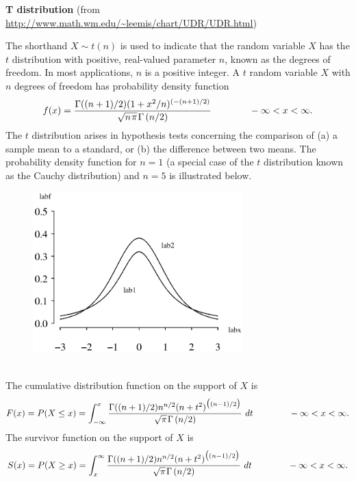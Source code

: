 \documentclass[12pt,fullpage]{article}
\begin{document}
\noindent
{\bf T distribution}  (from \color{blue}\url{http://www.math.wm.edu/~leemis/chart/UDR/UDR.html}\color{black})

\noindent
The shorthand $X \sim t(n)$ is used to indicate that the
random variable $X$ has the $t$ distribution with positive,
real-valued parameter $n$, known as the degrees of freedom.
In most applications, $n$ is a positive integer.
A $t$ random variable $X$ with $n$ degrees of freedom has
probability density function 
$$
f(x) = \frac{\Gamma((n+1)/2)(1 + x^2/n) ^ {(-(n+1)/2)}}
{\sqrt{n \kern 0.08 em \pi} \kern 0.08 em \Gamma \left( n/ 2 \right)}
\qquad \qquad -\infty < x < \infty.
$$
The $t$ distribution arises in hypothesis tests concerning the
comparison of (a) a sample mean to a standard, or (b)
the difference between two means.
The probability density function for $n=1$ (a special case of
the $t$ distribution known as the Cauchy distribution) and
$n=5$ is illustrated below.
{\begin{figure}[h!]
\begin{center}
\includegraphics[width=3.2in]{TPlot.ps}
\end{center}
\end{figure}}\\
The cumulative distribution function on the support of $X$ is
$$
F(x) = P(X \le x) = \displaystyle \int_{-\infty} ^ {x}
\frac{\Gamma((n+1)/2) n ^ {n/2} (n + t ^ 2) ^ {\big((n-1)/2\big)}}{\sqrt{\pi}
\kern 0.08 em \Gamma \left( n/2 \right)} \ dt
\qquad \qquad -\infty < x < \infty.
$$
The survivor function on the support of $X$ is
$$
S(x) = P(X \ge x) = \displaystyle \int_{x} ^ {\infty}
\frac{\Gamma((n+1)/2) n ^ {n/2} (n + t ^ 2) ^ {\big((n-1)/2\big)}}{\sqrt{\pi}
\kern 0.08 em \Gamma \left( n/2 \right)} \ dt
\qquad \qquad -\infty < x < \infty.
$$
\end{document}
